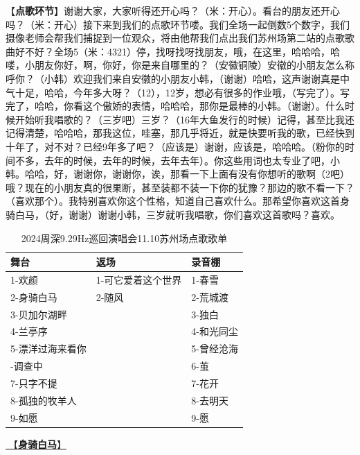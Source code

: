 \documentclass[]{ctexbook}
\begin{document}
【\textbf{点歌环节}】谢谢大家，大家听得还开心吗？（米：开心）。看台的朋友还开心吗？（米：开心）接下来到我们的点歌环节喽。我们全场一起倒数5个数字，我们摄像老师会帮我们捕捉到一位观众，将由他帮我们点出我们苏州场第二站的点歌歌曲好不好？全场5（米：4321）停，找呀找呀找朋友，哦，在这里，哈哈哈，哈喽，小朋友你好，啊，你好，你是来自哪里的？（安徽铜陵）安徽的小朋友怎么称呼你？（小韩）欢迎我们来自安徽的小朋友小韩，（谢谢）哈哈，这声谢谢真是中气十足，哈哈，今年多大呀？（12），12岁，想必有很多的作业哦，（写完了）。写完了，哈哈，你看这个傲娇的表情，哈哈哈，那你是最棒的小韩。（谢谢）。什么时候开始听我唱歌的？（三岁吧）三岁？（16年大鱼发行的时候）记得，甚至比我还记得清楚，哈哈哈，那我这位，哇塞，那几乎将近，就是快要听我的歌，已经快到十年了，对不对？已经9年多了吧？（应该是）谢谢，应该是，哈哈哈。（粉你的时间不多，去年的时候，去年的时候，去年去年）。你这些用词也太专业了吧，小韩。哈哈，好，谢谢你，谢谢你，诶，那看一下上面有没有你想听的歌啊（2吧）哦？现在的小朋友真的很果断，甚至装都不装一下你的犹豫？那边的歌不看一下？（喜欢那个）。我特别喜欢你这个性格，知道自己喜欢什么。那希望你喜欢这首身骑白马，（好，谢谢）谢谢小韩，三岁就听我唱歌，你们喜欢这首歌吗？喜欢。

\begin{table}

\caption{\label{tab:unnamed-chunk-137}2024周深9.29Hz巡回演唱会11.10苏州场点歌歌单}
\centering
\begin{tabular}[t]{lll}
\toprule
舞台 & 返场 & 录音棚\\
\midrule
1-欢颜 & 1-可它爱着这个世界 & 1-春雪\\
2-身骑白马 & 2-随风 & 2-荒城渡\\
3-贝加尔湖畔 &  & 3-独白\\
4-兰亭序 &  & 4-和光同尘\\
5-漂洋过海来看你 &  & 5-曾经沧海\\
\addlinespace
6-调查中 &  & 6-茧\\
7-只字不提 &  & 7-花开\\
8-孤独的牧羊人 &  & 8-去明天\\
9-如愿 &  & 9-愿\\
\bottomrule
\end{tabular}
\end{table}

\hyperref[Rading-white-horse]{🎵【\textbf{身骑白马}】}
\end{document}
